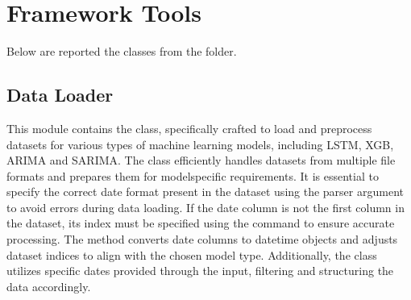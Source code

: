 \documentclass[letterpaper,10pt,english]{sphinxmanual}
\begin{document}
\chapter{Framework Tools}
\label{\detokenize{index:framework-tools}}
\sphinxAtStartPar
Below are reported the classes from the  folder.

\sphinxstepscope


\section{Data Loader}
\label{\detokenize{docs/data_loader:data-loader}}\label{\detokenize{docs/data_loader::doc}}
\sphinxAtStartPar
This module contains the  class, specifically crafted to load and preprocess datasets
for various types of machine learning models, including LSTM, XGB, ARIMA and SARIMA.
The class efficiently handles datasets from multiple file formats and prepares them for model\sphinxhyphen{}specific requirements.
It is essential to specify the correct date format present in the dataset using the  parser argument
to avoid errors during data loading.
If the date column is not the first column in the dataset, its index must be specified using the  command
to ensure accurate processing.
The  method converts date columns to datetime objects and adjusts dataset indices to align with the chosen model type.
Additionally, the class utilizes specific dates provided through the  input, filtering and structuring the data accordingly.
\label{\detokenize{docs/data_loader:module-data_loader}}
\end{document}
